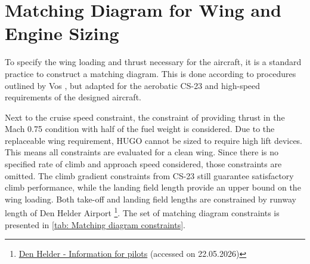 







\section{Matching Diagram for Wing and Engine Sizing}
\label{sec:matching_diagram}

To specify the wing loading and thrust necessary for the aircraft, it is a standard practice to construct a matching diagram. This is done according to procedures outlined by Vos \cite{Vos}, but adapted for the aerobatic CS-23 and high-speed requirements of the designed aircraft.

Next to the cruise speed constraint, the constraint of providing thrust in the Mach 0.75 condition with half of the fuel weight is considered. Due to the replaceable wing requirement, HUGO cannot be sized to require high lift devices. This means all constraints are evaluated for a clean wing. Since there is no specified rate of climb and approach speed considered, those constraints are omitted. The climb gradient constraints from CS-23 still guarantee satisfactory climb performance, while the landing field length provide an upper bound on the wing loading. Both take-off and landing field lengths are constrained by runway length of Den Helder Airport \footnote{\href{https://denhelderairport.nl/eng/information-for-pilots/}{Den Helder - Information for pilots} (accessed on 22.05.2026)}. The set of matching diagram constraints is presented in \autoref{tab: Matching diagram constraints}.

